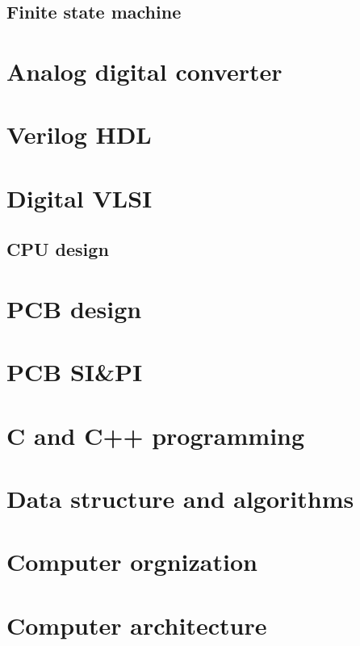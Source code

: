 \documentclass[UTF8]{book}
\begin{document}
	\begin{comment} 
	rather stupid, but helpful 
	\end{comment}
	
	\chapter{Finite state machine}
	\label{Finite state machine}
	
	\part{Analog digital converter}
	\label{Analog digital converter}
	
	\part{Verilog HDL}
	\label{Verilog HDL}
	
	\part{Digital VLSI}
	\label{Digital VLSI}
	\chapter{CPU design}
	\label{CPU design}
	
	\part{PCB design}
	\label{PCB design}
	
	\part{PCB SI\&PI}
	
	\part{C and C++ programming}
	
	\part{Data structure and algorithms}
	
	\part{Computer orgnization}
	
	\part{Computer architecture}
	
\end{document}
